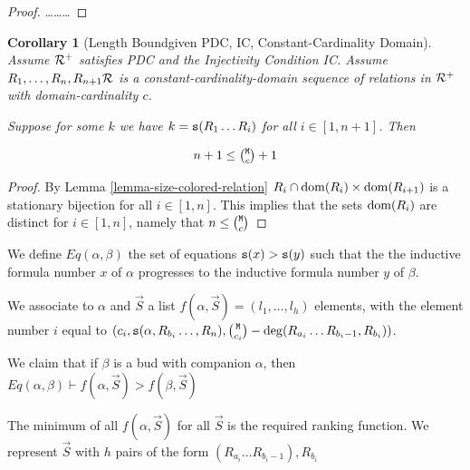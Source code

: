 \documentclass{lmcs}
\newtheorem{corollary}[theorem]{Corollary}
\begin{document}
\begin{proof}
\ldots\ldots\ldots
\end{proof}

\begin{corollary}[Length Boundgiven PDC, IC, Constant-Cardinality Domain]
Assume ${\mathcal R}^+$ satisfies PDC and the Injectivity Condition IC. 
Assume $R_1, \ldots, R_n, R_{n+1} {\mathcal R}$ is a constant-cardinality-domain sequence of 
relations in ${\mathcal R}^+$ with domain-cardinality $c$.

Suppose for some $k$
we have $k = {\tt s}(R_1 \ldots R_i)$ for all $i \in [1,n+1]$. Then

$$n+1 \le \newton{\MaxInd}{c}+1$$ 
\end{corollary}

\begin{proof}
By Lemma \ref{lemma-size-colored-relation} 
$R_i \cap {\rm dom}(R_i) \times {\rm dom}(R_{i+1})$ is a stationary bijection for all $i \in [1,n ]$.
This implies that the sets ${\rm dom}(R_i)$ are distinct for $i \in [1,n ]$, namely that 
$n \le  \newton{\MaxInd}{c}$
\end{proof}


We define $Eq(\alpha, \beta)$ the set of equations ${\tt s}(x) > {\tt s}(y)$ such that the
the inductive formula number $x$ of $\alpha$ progresses to the inductive formula number $y$
 of $\beta$.
 
 We associate to $\alpha$ and $\vec{S}$ a list 
 $f(\alpha,\vec{S})=(l_1, \ldots, l_h)$ elements, with the element 
 number $i$ equal to 
 $(
 c_i, 
 \size(\alpha, R_{b_i}\ldots, R_n), 
 \newton{\MaxInd}{c_i} - \deg(R_{a_i} \ldots R_{b_i-1}, R_{b_i})
 )$.
 

We claim that if $\beta$ is a bud with companion $\alpha$, then 
$Eq(\alpha, \beta) \vdash f(\alpha,\vec{S}) > f(\beta,\vec{S})$

The minimum of all $f(\alpha,\vec{S})$ for all $\vec{S}$ is the required ranking function.
We represent $\vec{S}$ with $h$ pairs of the form $(R_{a_i}\ldots R_{b_i-1}),R_{b_i}$




 
\end{document}
